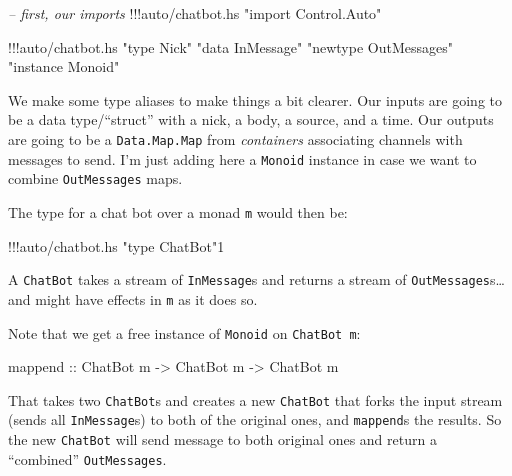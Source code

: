 \documentclass[]{article}
\newenvironment{Shaded}{}{}
\newcommand{\DataTypeTok}[1]{\textcolor[rgb]{0.56,0.13,0.00}{{#1}}}
\newcommand{\DecValTok}[1]{\textcolor[rgb]{0.25,0.63,0.44}{{#1}}}
\newcommand{\StringTok}[1]{\textcolor[rgb]{0.25,0.44,0.63}{{#1}}}
\newcommand{\CommentTok}[1]{\textcolor[rgb]{0.38,0.63,0.69}{\textit{{#1}}}}
\newcommand{\OtherTok}[1]{\textcolor[rgb]{0.00,0.44,0.13}{{#1}}}
\newcommand{\FunctionTok}[1]{\textcolor[rgb]{0.02,0.16,0.49}{{#1}}}
\newcommand{\NormalTok}[1]{{#1}}
\begin{document}
\begin{Shaded}
\begin{Highlighting}[]
\CommentTok{-- first, our imports}
\FunctionTok{!!!}\NormalTok{auto}\FunctionTok{/}\NormalTok{chatbot}\FunctionTok{.}\NormalTok{hs }\StringTok{"import Control.Auto"}
\end{Highlighting}
\end{Shaded}

\begin{Shaded}
\begin{Highlighting}[]
\FunctionTok{!!!}\NormalTok{auto}\FunctionTok{/}\NormalTok{chatbot}\FunctionTok{.}\NormalTok{hs }\StringTok{"type Nick"} \StringTok{"data InMessage"} \StringTok{"newtype OutMessages"} \StringTok{"instance Monoid"}
\end{Highlighting}
\end{Shaded}

We make some type aliases to make things a bit clearer. Our inputs are
going to be a data type/``struct'' with a nick, a body, a source, and a
time. Our outputs are going to be a \texttt{Data.Map.Map} from
\emph{containers} associating channels with messages to send. I'm just
adding here a \texttt{Monoid} instance in case we want to combine
\texttt{OutMessages} maps.

The type for a chat bot over a monad \texttt{m} would then be:

\begin{Shaded}
\begin{Highlighting}[]
\FunctionTok{!!!}\NormalTok{auto}\FunctionTok{/}\NormalTok{chatbot}\FunctionTok{.}\NormalTok{hs }\StringTok{"type ChatBot"}\DecValTok{1}
\end{Highlighting}
\end{Shaded}

A \texttt{ChatBot} takes a stream of \texttt{InMessage}s and returns a
stream of \texttt{OutMessages}s\ldots{}and might have effects in
\texttt{m} as it does so.

Note that we get a free instance of \texttt{Monoid} on
\texttt{ChatBot\ m}:

\begin{Shaded}
\begin{Highlighting}[]
\OtherTok{mappend ::} \DataTypeTok{ChatBot} \NormalTok{m }\OtherTok{->} \DataTypeTok{ChatBot} \NormalTok{m }\OtherTok{->} \DataTypeTok{ChatBot} \NormalTok{m}
\end{Highlighting}
\end{Shaded}

That takes two \texttt{ChatBot}s and creates a new \texttt{ChatBot} that
forks the input stream (sends all \texttt{InMessage}s) to both of the
original ones, and \texttt{mappend}s the results. So the new
\texttt{ChatBot} will send message to both original ones and return a
``combined'' \texttt{OutMessages}.
\end{document}
